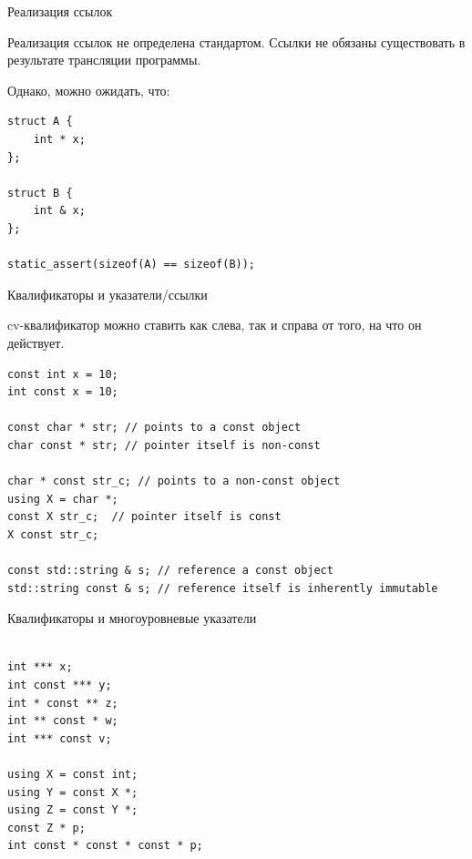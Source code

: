\documentclass[unknownkeysallowed,xcolor=table]{beamer}
\begin{document}
\begin{frame}[fragile]{Реализация ссылок}

Реализация ссылок не определена стандартом. Ссылки не обязаны существовать в результате трансляции программы.

\vspace{1em}

Однако, можно ожидать, что:

\vspace{1em}

\begin{lstlisting}
struct A {
    int * x;
};

struct B {
    int & x;
};

static_assert(sizeof(A) == sizeof(B));
\end{lstlisting}

\end{frame}

\begin{frame}[fragile]{Квалификаторы и указатели/ссылки}

cv-квалификатор можно ставить как слева, так и справа от того, на что он действует.

\vspace{1em}

\begin{lstlisting}
const int x = 10;
int const x = 10;

const char * str; // points to a const object
char const * str; // pointer itself is non-const

char * const str_c; // points to a non-const object
using X = char *;
const X str_c;  // pointer itself is const
X const str_c;

const std::string & s; // reference a const object
std::string const & s; // reference itself is inherently immutable

\end{lstlisting}

\end{frame}

\begin{frame}[fragile]{Квалификаторы и многоуровневые указатели}

\begin{lstlisting}

int *** x;
int const *** y;
int * const ** z;
int ** const * w;
int *** const v;

using X = const int;
using Y = const X *;
using Z = const Y *;
const Z * p;
int const * const * const * p;

\end{lstlisting}

\end{frame}
\end{document}
